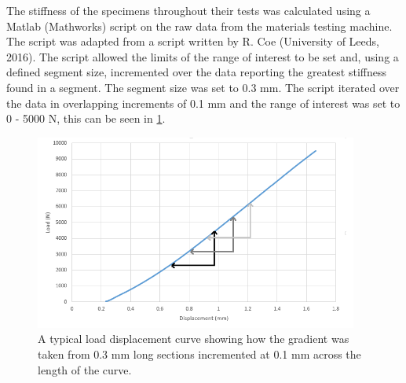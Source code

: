 

The stiffness of the specimens throughout their tests was calculated using a
Matlab (Mathworks) script on the raw data from the materials testing machine.
The script was adapted from a script written by R. Coe (University of Leeds,
2016). The script allowed the limits of the range of interest to be set and,
using a defined segment size, incremented over the data reporting the greatest
stiffness found in a segment. The segment size was set to 0.3 mm. The script
iterated over the data in overlapping increments of 0.1 mm and the range of
interest was set to 0 - 5000 N, this can be seen in \cref{fig:load_disp_incr}.

\begin{figure}[ht!]

\centering
\includegraphics[width=4.18472in]{images/load_disp_incr.png}
\caption{A typical load displacement curve showing how the gradient was taken from 0.3 mm long sections incremented at 0.1 mm across the length of the curve.}
\label{fig:load_disp_incr}
\end{figure}


